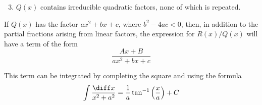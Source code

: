 \begin{frame}
\begin{enumerate}
\setcounter{enumi}{2}
\item  $Q(x)$ contains irreducible quadratic factors, none of which is repeated.
\end{enumerate}
If $Q(x)$ has the factor $ax^2 + bx + c$, where $b^2-4ac < 0$, then, in addition to the partial fractions arising from linear factors, the expression for $R(x)/Q(x)$ will have a term of the form
\[
\frac{Ax+B}{ax^2+bx+c}
\]

This term can be integrated by completing the square and using the formula
\[
\int \frac{\diff x}{x^2+a^2} = \frac{1}{a} \tan^{-1} \left( \frac{x}{a}\right) + C
\]
\end{frame}
